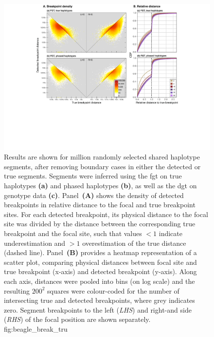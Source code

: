

\begin{figure}[tb]
\includegraphics[width=\textwidth]{./img/ch3/beagle_break_tru}
{Results are shown for  million randomly selected shared haplotype segments, after removing boundary cases in either the detected or true segments.
Segments were inferred using the \gls{fgt} on true haplotypes \textbf{(a)} and phased haplotypes \textbf{(b)}, as well as the \gls{dgt} on genotype data \textbf{(c)}.
Panel~\textbf{(A)} shows the density of detected breakpoints in relative distance to the focal and true breakpoint sites.
For each detected breakpoint, its physical distance to the focal site was divided by the distance between the corresponding true breakpoint and the focal site, such that values $<1$ indicate underestimation and $>1$ overestimation of the true distance (dashed line).
Panel~\textbf{(B)} provides a heatmap representation of a scatter plot, comparing physical distances between focal site and true breakpoint (x-axis) and detected breakpoint (y-axis).
Along each axis, distances were pooled into  bins (on log scale)
and the resulting $200^2$ squares were colour-coded for the number of  intersecting true and detected breakpoints, where grey indicates zero.
Segment breakpoints to the left (\emph{LHS}) and right-and side (\emph{RHS}) of the focal position are shown separately.}
{fig:beagle_break_tru}
\end{figure}

